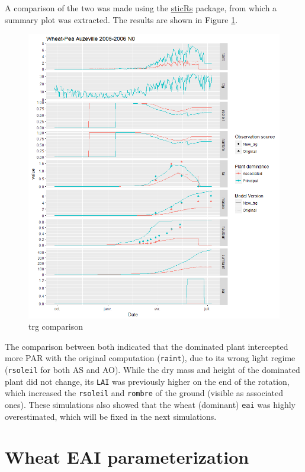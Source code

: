 \documentclass[]{book}
\theoremstyle{definition}
\theoremstyle{definition}
\theoremstyle{definition}
\theoremstyle{remark}
\begin{document}
A comparison of the two was made using the
\href{https://github.com/VEZY/sticRs}{sticRs} package, from which a
summary plot was extracted. The results are shown in Figure
\ref{fig:trgcomparison1}.

\begin{figure}
\centering
\includegraphics{img/trg-computation.png}
\caption{\label{fig:trgcomparison1}trg comparison}
\end{figure}

The comparison between both indicated that the dominated plant
intercepted more PAR with the original computation (\texttt{raint}), due
to its wrong light regime (\texttt{rsoleil} for both AS and AO). While
the dry mass and height of the dominated plant did not change, its
\texttt{LAI} was previously higher on the end of the rotation, which
increased the \texttt{rsoleil} and \texttt{rombre} of the ground
(visible as associated ones). These simulations also showed that the
wheat (dominant) \texttt{eai} was highly overestimated, which will be
fixed in the next simulations.

\chapter{Wheat EAI parameterization}\label{eai}
\end{document}
